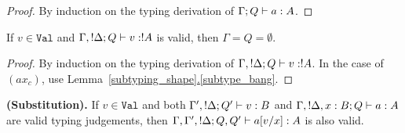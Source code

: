 \documentclass{article}
\begin{document}
\begin{proof}
By induction on the typing derivation of $\Gamma;Q \vdash a:A$.
\end{proof}

\begin{lemma}
\label{context_value}
If $v\in\mathtt{Val}$ and $\Gamma,!\Delta;Q \vdash v:!A$ is valid, 
then $\Gamma=Q=\emptyset$.
\end{lemma}

\begin{proof}
By induction on the typing derivation of $\Gamma,!\Delta;Q \vdash v:!A$. 
In the case of $(ax_c)$, use Lemma~\hyperref[subtype_bang]{\ref*{subtyping_shape}.\ref*{subtype_bang}}.
\end{proof}

\begin{lemma}
{\bf (Substitution).}
\label{substitution}
If $v\in\mathtt{Val}$ and both $\Gamma',!\Delta;Q' \vdash v:B$ and 
$\Gamma,!\Delta,x:B;Q \vdash a:A$ are valid typing judgements, 
then $\Gamma,\Gamma',!\Delta;Q,Q' \vdash a[v/x]:A$ is also valid.
\end{lemma}
\end{document}

